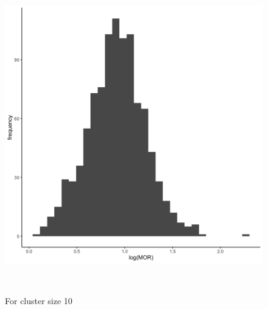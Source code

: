 \documentclass[
  letterpaper,
  DIV=11,
  numbers=noendperiod,
  titlepage]{scrartcl}
\begin{document}
\begin{figure}
\begin{minipage}[t]{0.50\linewidth}
{{\includegraphics{../../plots/two-lvl-ran-slope/high-prev/hist_50_10_two_lvl_slp_high_prev.png}

}

\caption{For cluster size 10}

}

\end{minipage}%
\newline
\begin{minipage}[t]{\linewidth}

{\centering 

~

}

\end{minipage}%
\newline
\begin{minipage}[t]{0.50\linewidth}

{\centering 

\raisebox{-\height}{

}}
\end{minipage}
\end{figure}
\end{document}
